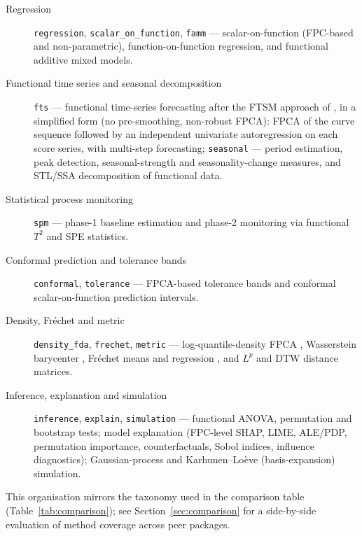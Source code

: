 \begin{description}
  \item[Regression]
    \texttt{regression}, \texttt{scalar\_on\_function}, \texttt{famm} ---
    scalar-on-function (FPC-based and non-parametric), function-on-function
    regression, and functional additive mixed models.

  \item[Functional time series and seasonal decomposition]
    \texttt{fts} --- functional time-series forecasting after the FTSM approach
    of \citet{hyndman_ullah_2007}, in a simplified form (no pre-smoothing,
    non-robust FPCA): FPCA of the curve sequence followed by an
    independent univariate autoregression on each score series, with
    multi-step forecasting;
    \texttt{seasonal} --- period estimation, peak detection, seasonal-strength
    and seasonality-change measures, and STL/SSA decomposition of functional
    data.

  \item[Statistical process monitoring]
    \texttt{spm} --- phase-1 baseline estimation and phase-2 monitoring via
    functional $T^2$ and SPE statistics.

  \item[Conformal prediction and tolerance bands]
    \texttt{conformal}, \texttt{tolerance} --- FPCA-based tolerance bands and
    conformal scalar-on-function prediction intervals.

  \item[Density, Fr\'{e}chet and metric]
    \texttt{density\_fda}, \texttt{frechet}, \texttt{metric} ---
    log-quantile-density FPCA \citep{petersen_muller_2016}, Wasserstein
    barycenter \citep{agueh_carlier_2011}, Fr\'{e}chet means and regression
    \citep{petersen_muller_2019}, and $L^p$ and DTW \citep{sakoe_chiba_1978} distance matrices.

  \item[Inference, explanation and simulation]
    \texttt{inference}, \texttt{explain}, \texttt{simulation} ---
    functional ANOVA, permutation and bootstrap tests; model explanation
    (FPC-level SHAP, LIME, ALE/PDP, permutation importance, counterfactuals,
    Sobol indices, influence diagnostics); Gaussian-process and
    Karhunen--Lo\`{e}ve (basis-expansion) simulation.
\end{description}

This organisation mirrors the taxonomy used in the comparison table
(Table~\ref{tab:comparison}); see Section~\ref{sec:comparison} for a
side-by-side evaluation of method coverage across peer packages.

